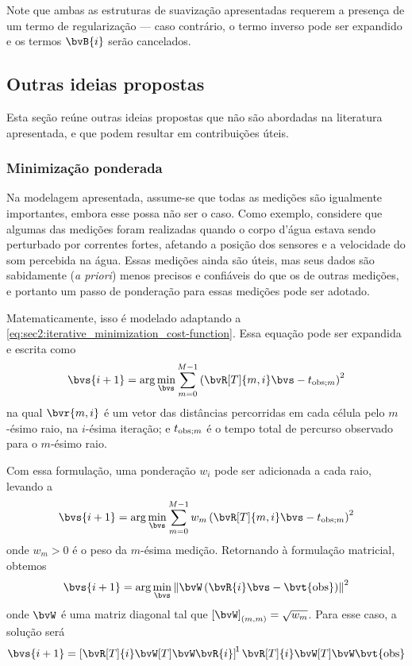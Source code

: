 Note que ambas as estruturas de suavização apresentadas requerem a presença de um termo de regularização  --- caso contrário, o termo inverso pode ser expandido e os termos $\bvB{i}$ serão cancelados.

\subsection{Outras ideias propostas}

Esta seção reúne outras ideias propostas que não são abordadas na literatura apresentada, e que podem resultar em contribuições úteis.

\subsubsection{Minimização ponderada}

Na modelagem apresentada, assume-se que todas as medições são igualmente importantes, embora esse possa não ser o caso. Como exemplo, considere que algumas das medições foram realizadas quando o corpo d’água estava sendo perturbado por correntes fortes, afetando a posição dos sensores e a velocidade do som percebida na água. Essas medições ainda são úteis, mas seus dados são sabidamente (\textit{a priori}) menos precisos e confiáveis do que os de outras medições, e portanto um passo de ponderação para essas medições pode ser adotado.

Matematicamente, isso é modelado adaptando a \cref{eq:sec2:iterative_minimization_cost-function}. Essa equação pode ser expandida e escrita como
\begin{equation}
	\bvs{i+1} = \arg \min_{\bvs} \sum_{m=0}^{M-1} \pts{\bvR[T]{m,i} \bvs - t_{\obs;m}}^2
\end{equation}
na qual $\bvr{m,i}$ é um vetor das distâncias percorridas em cada célula pelo $m$-ésimo raio, na $i$-ésima iteração; e $t_{\operatorname{obs};m}$ é o tempo total de percurso observado para o $m$-ésimo raio.

Com essa formulação, uma ponderação $w_i$ pode ser adicionada a cada raio, levando a
\begin{equation}
	\bvs{i+1} = \arg \min_{\bvs} \sum_{m=0}^{M-1} w_m \pts{\bvR[T]{m,i} \bvs - t_{\obs;m}}^2
\end{equation}
onde $w_m > 0$ é o peso da $m$-ésima medição. Retornando à formulação matricial, obtemos
\begin{equation}
	\bvs{i+1} = \arg \min_{\bvs} \norm{\bvW \pts{\bvR{i} \bvs - \bvt{\obs}}}^2
\end{equation}
onde $\bvW$ é uma matriz diagonal tal que $\el{\bvW}{m,m} = \sqrt{w_m}$. Para esse caso, a solução será
\begin{equation}
	\bvs{i+1} = \inv*{\bvR[T]{i} \bvW[T] \bvW \bvR{i}} \bvR[T]{i} \bvW[T] \bvW \bvt{\obs}
\end{equation}

